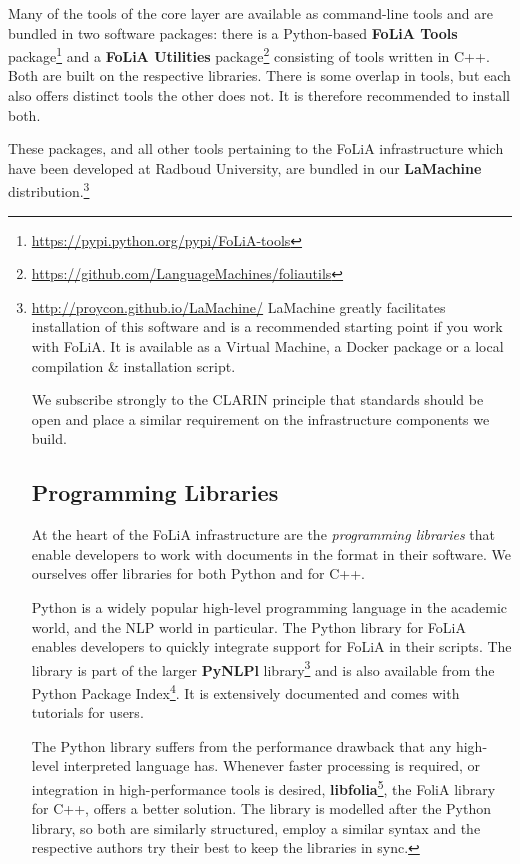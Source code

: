 \documentclass[a4paper,11pt]{article}
\begin{document}
Many of the tools of the core layer are available as command-line tools and are
bundled in two software packages: there is a Python-based \textbf{FoLiA Tools}
package\footnote{\url{https://pypi.python.org/pypi/FoLiA-tools}} and a \textbf{FoLiA
Utilities} package\footnote{\url{https://github.com/LanguageMachines/foliautils}}
consisting of tools written in C++. Both are built on the respective libraries.
There is some overlap in tools, but each also offers distinct tools the other
does not. It is therefore recommended to install both.

These packages, and all other tools pertaining to the FoLiA infrastructure
which have been developed at Radboud University, are bundled in our
\textbf{LaMachine}
distribution.\footnote{\url{http://proycon.github.io/LaMachine/} LaMachine
greatly facilitates installation of this software and is a recommended starting
point if you work with FoLiA. It is available as a Virtual Machine, a Docker
package or a local compilation \& installation script.

We subscribe strongly to the CLARIN principle that standards should be open and
place a similar requirement on the infrastructure components we build. 

\subsection{Programming Libraries}

At the heart of the FoLiA infrastructure are the \emph{programming libraries} that
enable developers to work with documents in the format in their software. We
ourselves offer libraries for both Python and for C++.

Python is a widely popular high-level programming language in the academic
world, and the NLP world in particular.  The Python library for FoLiA enables
developers to quickly integrate support for FoLiA in their scripts. The library
is part of the larger \textbf{PyNLPl}
library\footnote{\url{https://github.com/proycon/pynlpl}} and is also available from the
Python Package Index\footnote{\url{https://pypi.python.org/pypi/PyNLPl}}. It is extensively documented and comes with tutorials for
users.

The Python library suffers from the performance drawback that any high-level
interpreted language has. Whenever faster processing is required, or
integration in high-performance tools is desired,
\textbf{libfolia}\footnote{\url{https://github.com/languagemachines/libfolia}}, the
FoliA library for C++, offers a better solution. The library is modelled after
the Python library, so both are similarly structured, employ a similar syntax
and the respective authors try their best to keep the libraries in sync.

}
\end{document}

